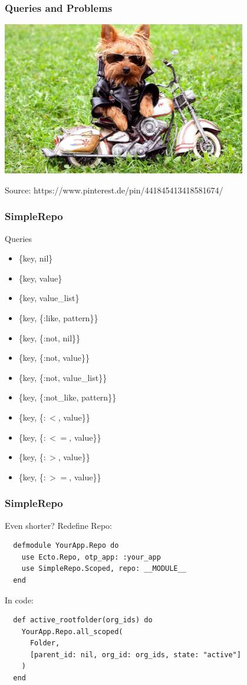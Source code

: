 \documentclass{beamer}
\begin{document}
\begin{frame}[fragile]
\frametitle{Queries and Problems}
\centerline{\includegraphics[width=0.8\textwidth]{cool_dog.jpg}}
\begin{tiny}
\centerline{Source: https://www.pinterest.de/pin/441845413418581674/}
\end{tiny}
\end{frame}


\begin{frame}[fragile]
\frametitle{SimpleRepo}
\centerline{Queries}
\begin{itemize}
\item \{key, nil\}
\item \{key, value\}
\item \{key, value\_list\}
\item \{key, \{:like, pattern\}\}
\item \{key, \{:not, nil\}\}
\item \{key, \{:not, value\}\}
\item \{key, \{:not, value\_list\}\}
\item \{key, \{:not\_like, pattern\}\}
\item \{key, \{$:<$, value\}\}
\item \{key, \{$:<=$, value\}\}
\item \{key, \{$:>$, value\}\}
\item \{key, \{$:>=$, value\}\}
\end{itemize}
\end{frame}


\begin{frame}[fragile]
\frametitle{SimpleRepo}
\centerline{Even shorter? Redefine Repo:}
\begin{verbatim}
  defmodule YourApp.Repo do
    use Ecto.Repo, otp_app: :your_app
    use SimpleRepo.Scoped, repo: __MODULE__
  end
\end{verbatim}
\pause
\centerline{In code:}
\begin{verbatim}
  def active_rootfolder(org_ids) do
    YourApp.Repo.all_scoped(
      Folder,
      [parent_id: nil, org_id: org_ids, state: "active"]
    )
  end
\end{verbatim}
\end{frame}
\end{document}
